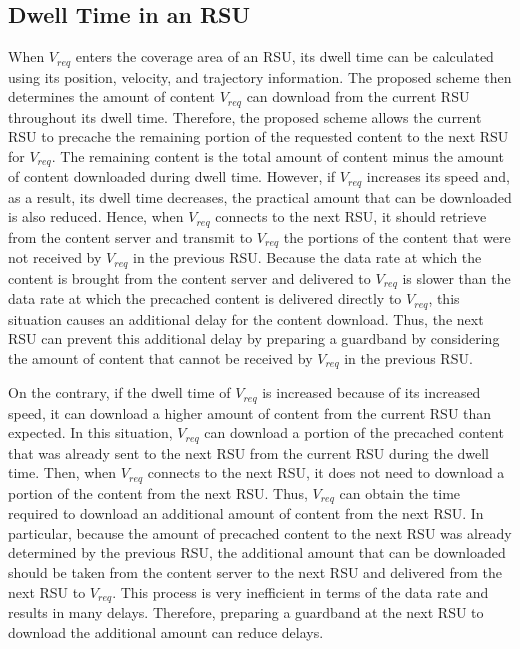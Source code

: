 \documentclass[electronics,aricle,accept,pdftex,moreauthors]{Definitions/mdpi}
\begin{document}
\subsection{Dwell Time in an RSU} \label{sec4.1}
When ${V}_{req}$ enters the coverage area of an RSU, its dwell time can be calculated using its position, velocity, and trajectory information. The proposed scheme then determines the amount of content ${V}_{req}$ can download from the current RSU throughout its dwell time. Therefore, the proposed scheme allows the current RSU to precache the remaining portion of the requested content to the next RSU for ${V}_{req}$. The remaining content is the total amount of content minus the amount of content downloaded during dwell time. However, if ${V}_{req}$ increases its speed and, as a result, its dwell time decreases, the practical amount that can be downloaded is also reduced. Hence, when ${V}_{req}$ connects to the next RSU, it should retrieve from the content server and transmit to ${V}_{req}$ the portions of the content that were not received by ${V}_{req}$ in the previous RSU. Because the data rate at which the content is brought from the content server and delivered to ${V}_{req}$ is slower than the data rate at which the precached content is delivered directly to ${V}_{req}$, this situation causes an additional delay for the content download. Thus, the next RSU can prevent this additional delay by preparing a guardband by considering the amount of content that cannot be received by ${V}_{req}$ in the previous RSU.

On the contrary, if the dwell time of ${V}_{req}$ is increased because of its increased speed, it can download a higher amount of content from the current RSU than expected. In this situation, ${V}_{req}$ can download a portion of the precached content that was already sent to the next RSU from the current RSU during the dwell time. Then, when ${V}_{req}$ connects to the next RSU, it does not need to download a portion of the content from the next RSU. Thus, ${V}_{req}$ can obtain the time required to download an additional amount of content from the next RSU. In particular, because the amount of precached content to the next RSU was already determined by the previous RSU, the additional amount that can be downloaded should be taken from the content server to the next RSU and delivered from the next RSU to ${V}_{req}$. This process is very inefficient in terms of the data rate and results in many delays. Therefore, preparing a guardband at the next RSU to download the additional amount can reduce delays.
\end{document}
